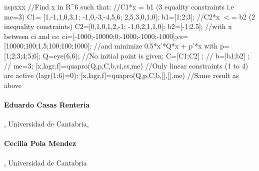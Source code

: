 \begin{examples}
  \begin{mintednsp}{nspxxx}
    //Find x in R^6 such that:
    //C1*x = b1 (3 equality constraints i.e me=3)
    C1= [1,-1,1,0,3,1;
        -1,0,-3,-4,5,6;
        2,5,3,0,1,0];
    b1=[1;2;3];
    //C2*x $<$= b2 (2 inequality constraints)
    C2=[0,1,0,1,2,-1;  -1,0,2,1,1,0];
    b2=[-1;2.5];
    //with  x between ci and cs:
    ci=[-1000;-10000;0;-1000;-1000;-1000];cs=[10000;100;1.5;100;100;1000];
    //and minimize 0.5*x'*Q*x + p'*x with
    p=[1;2;3;4;5;6]; Q=eye(6,6);
    //No initial point is given;
    C=[C1;C2] ; //
    b=[b1;b2] ;  //
    me=3;
    [x,lagr,f]=quapro(Q,p,C,b,ci,cs,me)
    //Only linear constraints (1 to 4) are active (lagr(1:6)=0):
    [x,lagr,f]=quapro(Q,p,C,b,[],[],me)   //Same result as above 
\end{mintednsp} 
\end{examples}
\begin{manseealso}
\end{manseealso}

\begin{authors}
  \paragraph{Eduardo Casas  Renteria} , Universidad de Cantabria,
  \paragraph{Cecilia Pola Mendez}  , Universidad de Cantabria 
\end{authors}
